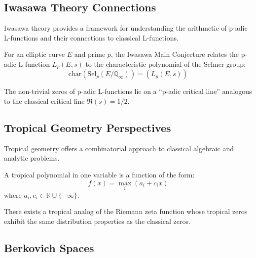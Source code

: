 \subsection{Iwasawa Theory Connections}

Iwasawa theory provides a framework for understanding the arithmetic of p-adic L-functions and their connections to classical L-functions.

\begin{definition}
\label{def:iwasawa_main}
For an elliptic curve $E$ and prime $p$, the Iwasawa Main Conjecture relates the p-adic L-function $L_p(E,s)$ to the characteristic polynomial of the Selmer group:
\begin{equation}
\text{char}(\text{Sel}_p(E/\mathbb{Q}_{\infty})) = (L_p(E,s))
\label{eq:iwasawa_main}
\end{equation}
\end{definition}

\begin{conjecture}
\label{conj:padic_rh}
The non-trivial zeros of p-adic L-functions lie on a ``p-adic critical line'' analogous to the classical critical line $\Re(s) = 1/2$.
\end{conjecture}

\subsection{Tropical Geometry Perspectives}

Tropical geometry offers a combinatorial approach to classical algebraic and analytic problems.

\begin{definition}
\label{def:tropical_polynomial}
A tropical polynomial in one variable is a function of the form:
\begin{equation}
f(x) = \max_{i} (a_i + c_i x)
\label{eq:tropical_polynomial}
\end{equation}
where $a_i, c_i \in \mathbb{R} \cup \{-\infty\}$.
\end{definition}

\begin{conjecture}
\label{conj:tropical_rh}
There exists a tropical analog of the Riemann zeta function whose tropical zeros exhibit the same distribution properties as the classical zeros.
\end{conjecture}

\subsection{Berkovich Spaces}

